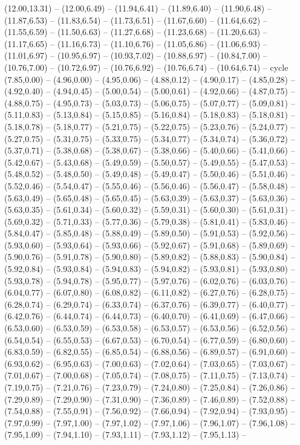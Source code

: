 {(12.00,13.31) -- (12.00,6.49) -- (11.94,6.41) -- (11.89,6.40) -- (11.90,6.48) -- (11.87,6.53) -- (11.83,6.54) -- (11.73,6.51) -- (11.67,6.60) -- (11.64,6.62) -- (11.55,6.59) -- (11.50,6.63) -- (11.27,6.68) -- (11.23,6.68) -- (11.20,6.63) -- (11.17,6.65) -- (11.16,6.73) -- (11.10,6.76) -- (11.05,6.86) -- (11.06,6.93) -- (11.01,6.97) -- (10.95,6.97) -- (10.93,7.02) -- (10.88,6.97) -- (10.84,7.00) -- (10.76,7.00) -- (10.72,6.97) -- (10.76,6.92) -- (10.76,6.74) -- (10.64,6.74) -- cycle}
\expandafter\def\csname geo:gebiet:AUT\endcsname{
  (7.85,0.00) -- (4.96,0.00) -- (4.95,0.06) -- (4.88,0.12) -- (4.90,0.17) -- (4.85,0.28) -- (4.92,0.40) -- (4.94,0.45) -- (5.00,0.54) -- (5.00,0.61) -- (4.92,0.66) -- (4.87,0.75) -- (4.88,0.75) -- (4.95,0.73) -- (5.03,0.73) -- (5.06,0.75) -- (5.07,0.77) -- (5.09,0.81) -- (5.11,0.83) -- (5.13,0.84) -- (5.15,0.85) -- (5.16,0.84) -- (5.18,0.83) -- (5.18,0.81) -- (5.18,0.78) -- (5.18,0.77) -- (5.21,0.75) -- (5.22,0.75) -- (5.23,0.76) -- (5.24,0.77) -- (5.27,0.75) -- (5.31,0.75) -- (5.33,0.75) -- (5.34,0.77) -- (5.34,0.74) -- (5.36,0.72) -- (5.37,0.71) -- (5.38,0.68) -- (5.38,0.67) -- (5.38,0.66) -- (5.40,0.66) -- (5.41,0.66) -- (5.42,0.67) -- (5.43,0.68) -- (5.49,0.59) -- (5.50,0.57) -- (5.49,0.55) -- (5.47,0.53) -- (5.48,0.52) -- (5.48,0.50) -- (5.49,0.48) -- (5.49,0.47) -- (5.50,0.46) -- (5.51,0.46) -- (5.52,0.46) -- (5.54,0.47) -- (5.55,0.46) -- (5.56,0.46) -- (5.56,0.47) -- (5.58,0.48) -- (5.63,0.49) -- (5.65,0.48) -- (5.65,0.45) -- (5.63,0.39) -- (5.63,0.37) -- (5.63,0.36) -- (5.63,0.35) -- (5.61,0.34) -- (5.60,0.32) -- (5.59,0.31) -- (5.60,0.30) -- (5.61,0.31) -- (5.69,0.32) -- (5.71,0.33) -- (5.77,0.36) -- (5.79,0.38) -- (5.81,0.41) -- (5.83,0.46) -- (5.84,0.47) -- (5.85,0.48) -- (5.88,0.49) -- (5.89,0.50) -- (5.91,0.53) -- (5.92,0.56) -- (5.93,0.60) -- (5.93,0.64) -- (5.93,0.66) -- (5.92,0.67) -- (5.91,0.68) -- (5.89,0.69) -- (5.90,0.76) -- (5.91,0.78) -- (5.90,0.80) -- (5.89,0.82) -- (5.88,0.83) -- (5.90,0.84) -- (5.92,0.84) -- (5.93,0.84) -- (5.94,0.83) -- (5.94,0.82) -- (5.93,0.81) -- (5.93,0.80) -- (5.93,0.78) -- (5.94,0.78) -- (5.95,0.77) -- (5.97,0.76) -- (6.02,0.76) -- (6.03,0.76) -- (6.04,0.77) -- (6.07,0.80) -- (6.08,0.82) -- (6.11,0.82) -- (6.27,0.76) -- (6.28,0.75) -- (6.28,0.74) -- (6.29,0.74) -- (6.33,0.74) -- (6.37,0.76) -- (6.39,0.77) -- (6.40,0.77) -- (6.42,0.76) -- (6.44,0.74) -- (6.44,0.73) -- (6.40,0.70) -- (6.41,0.69) -- (6.47,0.66) -- (6.53,0.60) -- (6.53,0.59) -- (6.53,0.58) -- (6.53,0.57) -- (6.53,0.56) -- (6.52,0.56) -- (6.54,0.54) -- (6.55,0.53) -- (6.67,0.53) -- (6.70,0.54) -- (6.77,0.59) -- (6.80,0.60) -- (6.83,0.59) -- (6.82,0.55) -- (6.85,0.54) -- (6.88,0.56) -- (6.89,0.57) -- (6.91,0.60) -- (6.93,0.62) -- (6.95,0.63) -- (7.00,0.63) -- (7.02,0.64) -- (7.03,0.65) -- (7.03,0.67) -- (7.01,0.67) -- (7.00,0.68) -- (7.05,0.74) -- (7.08,0.75) -- (7.11,0.75) -- (7.13,0.74) -- (7.19,0.75) -- (7.21,0.76) -- (7.23,0.79) -- (7.24,0.80) -- (7.25,0.84) -- (7.26,0.86) -- (7.29,0.89) -- (7.29,0.90) -- (7.31,0.90) -- (7.36,0.89) -- (7.46,0.89) -- (7.52,0.88) -- (7.54,0.88) -- (7.55,0.91) -- (7.56,0.92) -- (7.66,0.94) -- (7.92,0.94) -- (7.93,0.95) -- (7.97,0.99) -- (7.97,1.00) -- (7.97,1.02) -- (7.97,1.06) -- (7.96,1.07) -- (7.96,1.08) -- (7.95,1.09) -- (7.94,1.10) -- (7.93,1.11) -- (7.93,1.12) -- (7.95,1.13) -- }
